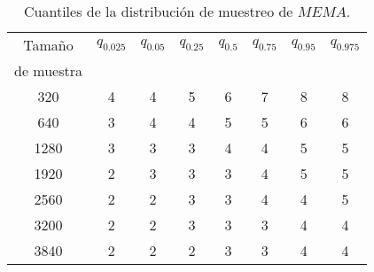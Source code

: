\documentclass[]{article}
\begin{document}
\begin{table}[ht]
\centering
\begin{tabular}{cccccccc}
\toprule
Tamaño & $q_{0.025}$ & $q_{0.05}$ & $q_{0.25}$ & $q_{0.5}$ & $q_{0.75}$ & $q_{0.95}$ & $q_{0.975}$\\
de muestra & \\
\midrule
\hline

320 & 4 & 4 & 5 & 6 & 7 & 8 & 8\\

640 & 3 & 4 & 4 & 5 & 5 & 6 & 6\\

1280 & 3 & 3 & 3 & 4 & 4 & 5 & 5\\

1920 & 2 & 3 & 3 & 3 & 4 & 5 & 5\\

2560 & 2 & 2 & 3 & 3 & 4 & 4 & 5\\

3200 & 2 & 2 & 3 & 3 & 3 & 4 & 4\\

3840 & 2 & 2 & 2 & 3 & 3 & 4 & 4\\

\bottomrule
\end{tabular}
\caption{Cuantiles de la distribución de muestreo de $MEMA$.}
\label{tab:cuantiles_mema}
\end{table}



\newpage
\end{document}

